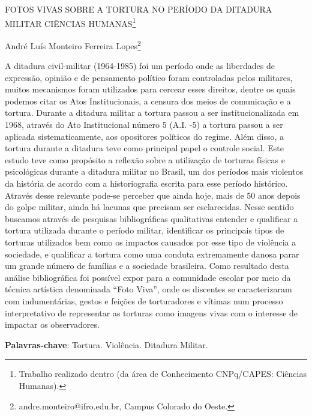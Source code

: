 \documentclass[article,12pt,onesidea,4paper,english,brazil]{abntex2}
\begin{document}
	
	
	\frenchspacing 
	
	\begin{center}
		\LARGE FOTOS VIVAS SOBRE A TORTURA NO PERÍODO DA DITADURA MILITAR
		CIÊNCIAS HUMANAS\footnote{Trabalho realizado dentro (da área de Conhecimento CNPq/CAPES: Ciências Humanas).}
		
		\normalsize
		André Luís Monteiro Ferreira Lopes\footnote{andre.monteiro@ifro.edu.br, Campus Colorado do Oeste.} 
	\end{center}
	
	\noindent A ditadura civil-militar (1964-1985) foi um período onde as liberdades de expressão, opinião e de pensamento político foram controladas pelos militares, muitos mecanismos foram utilizados para cercear esses direitos, dentre os quais podemos citar os Atos Institucionais, a censura dos meios de comunicação e a tortura. Durante a ditadura militar a tortura passou a ser institucionalizada em 1968, através do Ato Institucional número 5 (A.I. -5) a tortura passou a ser aplicada sistematicamente, aos opositores políticos do regime. Além disso, a tortura durante a ditadura teve como principal papel o controle social. Este estudo teve como propósito a reflexão sobre a utilização de torturas físicas e psicológicas durante a ditadura militar no Brasil, um dos períodos mais violentos da história de acordo com a historiografia escrita para esse período histórico. Através desse relevante pode-se perceber que ainda hoje, mais de 50 anos depois do golpe militar, ainda há lacunas que precisam ser esclarecidas. Nesse sentido buscamos através de pesquisas bibliográficas qualitativas entender e qualificar a tortura utilizada durante o período militar, identificar os principais tipos de torturas utilizados bem como os impactos causados por esse tipo de violência a sociedade, e qualificar a tortura como uma conduta extremamente danosa parar um grande número de famílias e a sociedade brasileira. Como resultado desta análise bibliográfica foi possível expor para a comunidade escolar por meio da técnica artística denominada “Foto Viva”, onde os discentes se caracterizaram com indumentárias, gestos e feições de torturadores e vítimas num processo interpretativo de representar as torturas como imagens vivas com o interesse de impactar os observadores.
	\vspace{\onelineskip}
	
	\noindent
	\textbf{Palavras-chave}: Tortura. Violência. Ditadura Militar.
	
\end{document}
